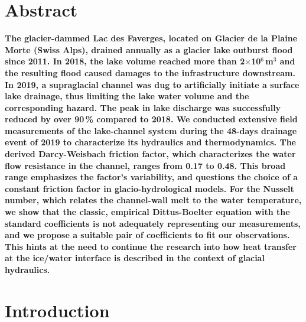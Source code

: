 \clearpage

\section{Abstract}

\textbf{The glacier-dammed Lac des Faverges, located on Glacier de la Plaine Morte (Swiss Alps), drained annually as a glacier lake outburst flood since 2011. In 2018, the lake volume reached more than 2$\times$10$^6$\,m$^3$ and the resulting flood caused damages to the infrastructure downstream. In 2019, a supraglacial channel was dug to artificially initiate a surface lake drainage, thus limiting the lake water volume and the corresponding hazard. The peak in lake discharge was successfully reduced by over 90\,\% compared to 2018. We conducted extensive field measurements of the lake-channel system during the 48-days drainage event of 2019 to characterize its hydraulics and thermodynamics. The derived Darcy-Weisbach friction factor, which characterizes the water flow resistance in the channel, ranges from 0.17 to 0.48. This broad range emphasizes the factor’s variability, and questions the choice of a constant friction factor in glacio-hydrological models. For the Nusselt number, which relates the channel-wall melt to the water temperature, we show that the classic, empirical Dittus-Boelter equation with the standard coefficients is not adequately representing our measurements, and we propose a suitable pair of coefficients to fit our observations. This hints at the need to continue the research into how heat transfer at the ice/water interface is described in the context of glacial hydraulics.}

\section{Introduction}

